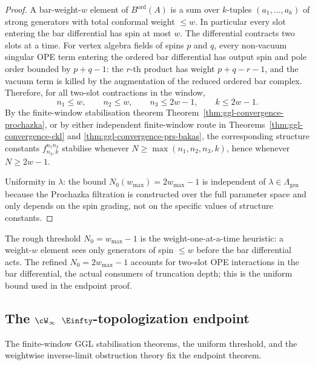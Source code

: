 \begin{proof}
A bar-weight-$w$ element of $B^{\mathrm{ord}}(A)$ is a sum over
$k$-tuples $(a_1, \ldots, a_k)$ of strong generators with total
conformal weight $\le w$. In particular every slot entering the
bar differential has spin at most $w$. The differential contracts two
slots at a time. For vertex algebra fields of spins $p$ and $q$, every
non-vacuum singular OPE term entering the ordered bar differential has
output spin and pole order bounded by $p+q-1$: the $r$-th product has
weight $p+q-r-1$, and the vacuum term is killed by the augmentation of
the reduced ordered bar complex. Therefore, for all two-slot
contractions in the window,
\[
n_1\le w,\qquad n_2\le w,\qquad n_3\le 2w-1,\qquad k\le 2w-1 .
\]
By the finite-window stabilisation theorem
Theorem~\ref{thm:ggl-convergence-prochazka}, or by either independent
finite-window route in
Theorems~\ref{thm:ggl-convergence-ckl} and
\ref{thm:ggl-convergence-prs-bakas}, the corresponding structure
constants $f^{n_1n_2}_{n_3,k}$ stabilise whenever
$N\ge\max(n_1,n_2,n_3,k)$, hence whenever $N\ge2w-1$.

Uniformity in $\lambda$: the bound $N_0(w_{\max}) = 2w_{\max} - 1$ is
independent of $\lambda \in \Lambda_{\mathrm{gen}}$ because the
Prochazka filtration is constructed over the full parameter space and
only depends on the spin grading, not on the specific values of
structure constants.
\end{proof}

\begin{remark}[The $N_0 = w_{\max} - 1$ heuristic]
\label{rem:n0-refinement-2wmax}
The rough threshold $N_0 = w_{\max} - 1$ is the
weight-one-at-a-time heuristic: a weight-$w$ element sees only
generators of spin $\le w$ before the bar differential acts.
The refined $N_0 = 2 w_{\max} - 1$ accounts for two-slot OPE
interactions in the bar differential, the actual consumers of
truncation depth; this is the uniform bound used in the
endpoint proof.
\end{remark}

\subsection{The \texorpdfstring{$\cW_\infty$}{W-infinity}
\texorpdfstring{$\Einfty$}{E-infinity}-topologization endpoint}
\label{subsec:w-infty-endpoint-theorem}

The finite-window GGL stabilisation theorems, the uniform
threshold, and the weightwise inverse-limit obstruction theory
fix the endpoint theorem.


